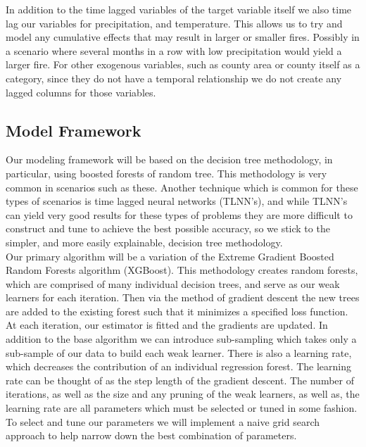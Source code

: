 \documentclass[12pt]{article}
\begin{document}
In addition to the time lagged variables of the target variable itself we also time lag our variables for precipitation, and temperature. This allows us to try and model any cumulative effects that may result in larger or smaller fires. Possibly in a scenario where several months in a row with low precipitation would yield a larger fire. For other exogenous variables, such as county area or county itself as a category, since they do not have a temporal relationship we do not create any lagged columns for those variables. 

\subsection{\textrm{Model Framework}} 

Our modeling framework will be based on the decision tree methodology, in particular, using boosted forests of random tree. This methodology is very common in scenarios such as these. Another technique which is common for these types of scenarios is time lagged neural networks (TLNN's), and while TLNN's can yield very good results for these types of problems they are more difficult to construct and tune to achieve the best possible accuracy, so we stick to the simpler, and more easily explainable, decision tree methodology. \\

Our primary algorithm will be a variation of the Extreme Gradient Boosted Random Forests algorithm (XGBoost). This methodology creates random forests, which are comprised of many individual decision trees, and serve as our weak learners for each iteration. Then via the method of gradient descent the new trees are added to the existing forest such that it minimizes a specified loss function. At each iteration, our estimator is fitted and the gradients are updated. In addition to the base algorithm we can introduce sub-sampling which takes only a sub-sample of our data to build each weak learner. There is also a learning rate, which decreases the contribution of an individual regression forest. The learning rate can be thought of as the step length of the gradient descent. The number of iterations, as well as the size and any pruning of the weak learners, as well as, the learning rate are all parameters which must be selected or tuned in some fashion. To select and tune our parameters we will implement a naive grid search approach to help narrow down the best combination of parameters. \\
\end{document}
